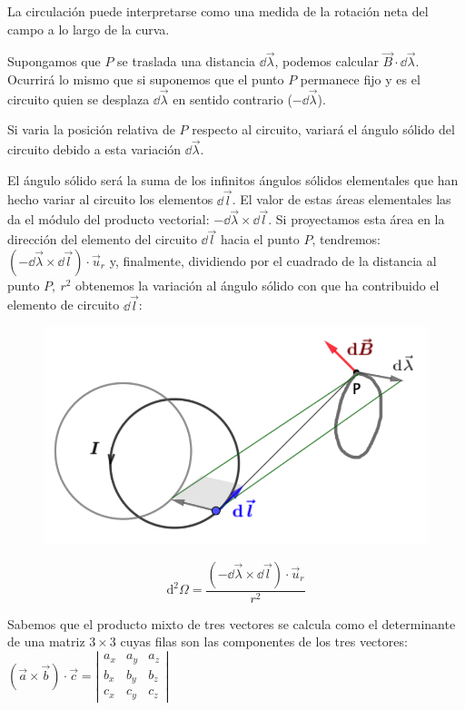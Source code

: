 La circulación puede interpretarse como una medida de la rotación neta del campo a lo largo de la curva.

Supongamos que $P$ se traslada una distancia $\dd \vec \lambda$, podemos calcular $\vec B \cdot \dd \vec \lambda$. Ocurrirá lo mismo que si suponemos que el punto $P$ permanece fijo y es el circuito quien se desplaza $\dd \vec \lambda$ en sentido contrario ($-\dd \vec \lambda$).

Si varia la posición relativa de $P$ respecto al circuito, variará el ángulo sólido del circuito debido a esta variación $\dd \vec \lambda$.

\begin{multicols}{2}
	El ángulo sólido será la suma de los infinitos ángulos sólidos elementales que han hecho variar al circuito los elementos $\dd \vec l$. El valor de estas áreas elementales las da el módulo del producto vectorial: $-\dd \vec \lambda \times  \dd \vec l$. Si proyectamos esta área en la dirección del elemento del circuito $\dd \vec l$ hacia el punto $P$, tendremos: $(-\dd \vec \lambda \times  \dd \vec l)\cdot \vec u_r$ y, finalmente, dividiendo por el cuadrado de la distancia al punto $P,\ r^2$ obtenemos la variación al ángulo sólido con que ha contribuido el elemento de circuito $\dd \vec l$:
\begin{figure}[H]
	\centering
	\includegraphics[width=.5\textwidth]{imagenes/imagenes27/T27IM02.png}
\end{figure}
\end{multicols}

$$\displaystyle \mathrm{d}^2 {\Omega}=\dfrac{(-\dd \vec \lambda \times  \dd \vec l)\cdot \vec u_r}{r^2}$$

\textcolor{gris}{Sabemos que el producto mixto de tres vectores se calcula como el determinante de una matriz $3\times 3$ cuyas filas son las componentes de los tres vectores:
$ (\vec a\times \vec b)\cdot \vec c=\left| \begin{matrix} a_x&a_y&a_z 
\\ b_x&b_y&b_z \\ c_x&c_y&c_z \end{matrix} \right|$}


